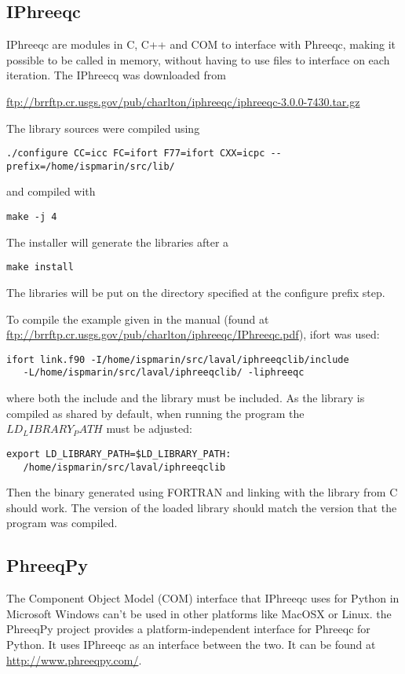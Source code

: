 \documentclass[12pt,a4paper,twoside]{report}
\begin{document}
\subsection{IPhreeqc}
IPhreeqc are modules in C, C++ and COM to interface with Phreeqc, making it possible to be called in memory, without having to use files to interface on each iteration. The IPhreecq was downloaded from 

\url{ftp://brrftp.cr.usgs.gov/pub/charlton/iphreeqc/iphreeqc-3.0.0-7430.tar.gz}

The library sources were compiled using

\begin{lstlisting}[style=Bash]
   ./configure CC=icc FC=ifort F77=ifort CXX=icpc --prefix=/home/ispmarin/src/lib/
\end{lstlisting}

and compiled with

\begin{lstlisting}[style=Bash]
   make -j 4
\end{lstlisting}

The installer will generate the libraries after a 
\begin{lstlisting}[style=Bash]
   make install
\end{lstlisting}
The libraries will be put on the directory specified at the configure prefix step.

To compile the example given in the manual (found at \url{ftp://brrftp.cr.usgs.gov/pub/charlton/iphreeqc/IPhreeqc.pdf}), ifort was used:

\begin{lstlisting}[style=Bash]
   ifort link.f90 -I/home/ispmarin/src/laval/iphreeqclib/include 
   -L/home/ispmarin/src/laval/iphreeqclib/ -liphreeqc
\end{lstlisting}
where both the include and the library must be included. As the library is compiled as shared by default, when running the program the $LD_LIBRARY_PATH$ must be adjusted:

\begin{lstlisting}[style=Bash]
   export LD_LIBRARY_PATH=$LD_LIBRARY_PATH:
   /home/ispmarin/src/laval/iphreeqclib
\end{lstlisting}
Then the binary generated using FORTRAN and linking with the library from C should work. The version of the loaded library should match the version that the program was compiled.



\subsection{PhreeqPy}
The Component Object Model (COM) interface that IPhreeqc uses for Python in Microsoft Windows can't be used in other platforms like MacOSX or Linux. the PhreeqPy project provides a platform-independent interface for Phreeqc for Python. It uses IPhreeqc as an interface between the two. It can be found at \url{http://www.phreeqpy.com/}. 
\end{document}
